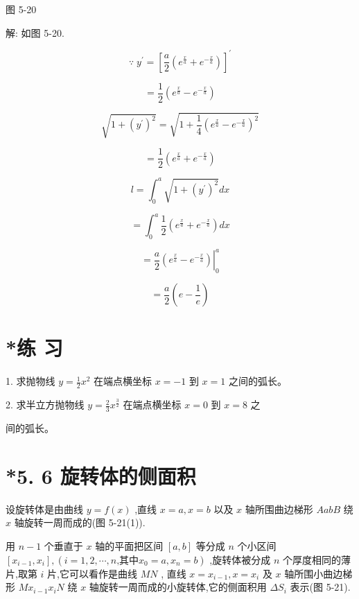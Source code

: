 \documentclass[10pt]{article}
\begin{document}
图 5-20

解: 如图 5-20.

\[
\because \;{y}^{\prime } = {\left\lbrack \frac{a}{2}\left( {e}^{\frac{x}{a}} + {e}^{-\frac{x}{a}}\right) \right\rbrack }^{\prime }
\]

\[
= \frac{1}{2}\left( {{e}^{\frac{x}{a}} - {e}^{-\frac{x}{a}}}\right)
\]

\[
\sqrt{1 + {\left( {y}^{\prime }\right) }^{2}} = \sqrt{1 + \frac{1}{4}{\left( {e}^{\frac{x}{a}} - {e}^{-\frac{x}{a}}\right) }^{2}}
\]

\[
= \frac{1}{2}\left( {{e}^{\frac{x}{a}} + {e}^{-\frac{x}{a}}}\right)
\]

\[
l = {\int }_{0}^{a}\sqrt{1 + {\left( {y}^{\prime }\right) }^{2}}{dx}
\]

\[
= {\int }_{0}^{a}\frac{1}{2}\left( {{e}^{\frac{x}{a}} + {e}^{-\frac{x}{a}}}\right) {dx}
\]

\[
= {\left. \frac{a}{2}\left( {e}^{\frac{x}{a}} - {e}^{-\frac{x}{a}}\right) \right| }_{0}^{a}
\]

\[
= \frac{a}{2}\left( {e - \frac{1}{e}}\right)
\]

\section*{*练 习}

1. 求抛物线 \(y = \frac{1}{2}{x}^{2}\) 在端点横坐标 \(x = - 1\) 到 \(x = 1\) 之间的弧长。

2. 求半立方抛物线 \(y = \frac{2}{3}{x}^{\frac{3}{2}}\) 在端点横坐标 \(x = 0\) 到 \(x = 8\) 之

间的弧长。

\section*{*5. 6 旋转体的侧面积}

设旋转体是由曲线 \(y = f\left( x\right)\) ,直线 \(x = a,x = b\) 以及 \(x\) 轴所围曲边梯形 \({AabB}\) 绕 \(x\) 轴旋转一周而成的(图 5-21(1)).

用 \(n - 1\) 个垂直于 \(x\) 轴的平面把区间 \(\left\lbrack {a,b}\right\rbrack\) 等分成 \(n\) 个小区间 \(\left\lbrack {{x}_{i - 1},{x}_{i}}\right\rbrack ,\left( {i = 1,2,\cdots ,n\text{,其中}{x}_{0} = a,{x}_{n} = b}\right)\) ,旋转体被分成 \(n\) 个厚度相同的薄片,取第 \(i\) 片,它可以看作是曲线 \({MN}\) , 直线 \(x = {x}_{i - 1},x = {x}_{i}\) 及 \(x\) 轴所围小曲边梯形 \(M{x}_{i - 1}{x}_{i}N\) 绕 \(x\) 轴旋转一周而成的小旋转体,它的侧面积用 \(\Delta {S}_{i}\) 表示(图 5-21).
\end{document}
